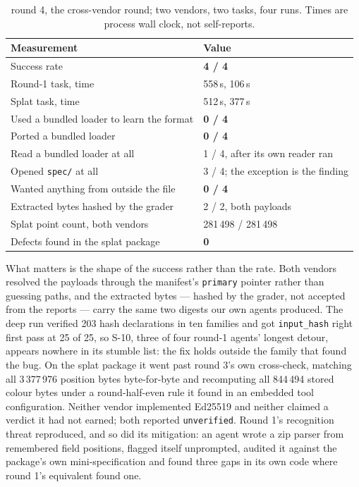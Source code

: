 \documentclass[10pt,twocolumn,letterpaper]{article}
\newcommand{\code}[1]{\texttt{\small #1}}
\begin{document}
\begin{table}[t]\centering\footnotesize
\caption{round 4, the cross-vendor round; two vendors, two tasks, four runs. Times are process wall clock, not self-reports.}
\begin{tabular}{@{}L{4.2cm} L{3.3cm}@{}}
\toprule
Measurement & Value \\
\midrule
Success rate & \textbf{4 / 4} \\
Round-1 task, time & 558\,s, 106\,s \\
Splat task, time & 512\,s, 377\,s \\
Used a bundled loader to learn the format & \textbf{0 / 4} \\
Ported a bundled loader & \textbf{0 / 4} \\
Read a bundled loader at all & 1 / 4, after its own reader ran \\
Opened \code{spec/} at all & 3 / 4; the exception is the finding \\
Wanted anything from outside the file & \textbf{0 / 4} \\
Extracted bytes hashed by the grader & 2 / 2, both payloads \\
Splat point count, both vendors & 281\,498 / 281\,498 \\
Defects found in the splat package & \textbf{0} \\
\bottomrule
\end{tabular}
\end{table}

What matters is the shape of the success rather than the rate. Both vendors resolved the payloads through the manifest's \code{primary} pointer rather than guessing paths, and the extracted bytes --- hashed by the grader, not accepted from the reports --- carry the same two digests our own agents produced. The deep run verified 203 hash declarations in ten families and got \code{input\_hash} right first pass at 25 of 25, so S-10, three of four round-1 agents' longest detour, appears nowhere in its stumble list: the fix holds outside the family that found the bug. On the splat package it went past round 3's own cross-check, matching all 3\,377\,976 position bytes byte-for-byte and recomputing all 844\,494 stored colour bytes under a round-half-even rule it found in an embedded tool configuration. Neither vendor implemented Ed25519 and neither claimed a verdict it had not earned; both reported \code{unverified}. Round 1's recognition threat reproduced, and so did its mitigation: an agent wrote a zip parser from remembered field positions, flagged itself unprompted, audited it against the package's own mini-specification and found three gaps in its own code where round 1's equivalent found one.
\end{document}

